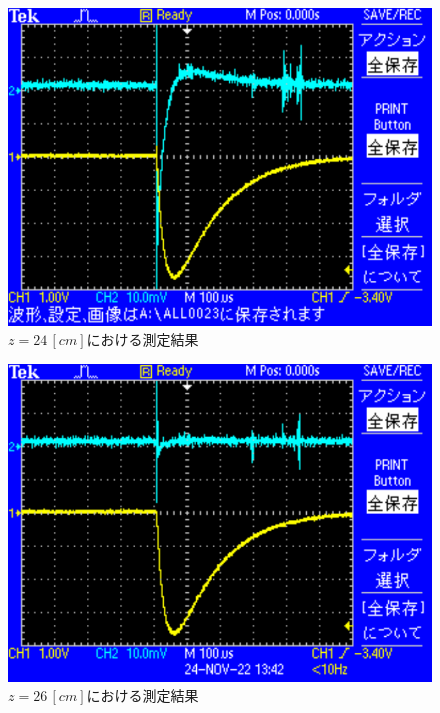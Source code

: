 \begin{figure}[H]
    \centering
    \includegraphics[scale=0.5]{images-13.pdf}
    \caption{$z=24\,[cm]$における測定結果}
\end{figure}

\begin{figure}[H]
    \centering
    \includegraphics[scale=0.5]{images-14.pdf}
    \caption{$z=26\,[cm]$における測定結果}
\end{figure}

